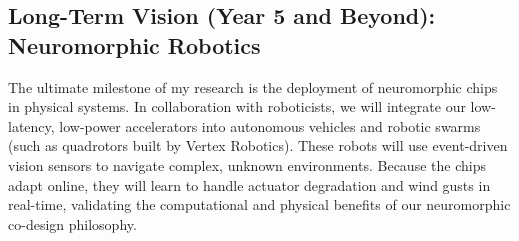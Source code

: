 \subsection{Long-Term Vision (Year 5 and Beyond): Neuromorphic Robotics}
The ultimate milestone of my research is the deployment of neuromorphic chips in physical systems. In collaboration with roboticists, we will integrate our low-latency, low-power accelerators into autonomous vehicles and robotic swarms (such as quadrotors built by Vertex Robotics). These robots will use event-driven vision sensors to navigate complex, unknown environments. Because the chips adapt online, they will learn to handle actuator degradation and wind gusts in real-time, validating the computational and physical benefits of our neuromorphic co-design philosophy.
